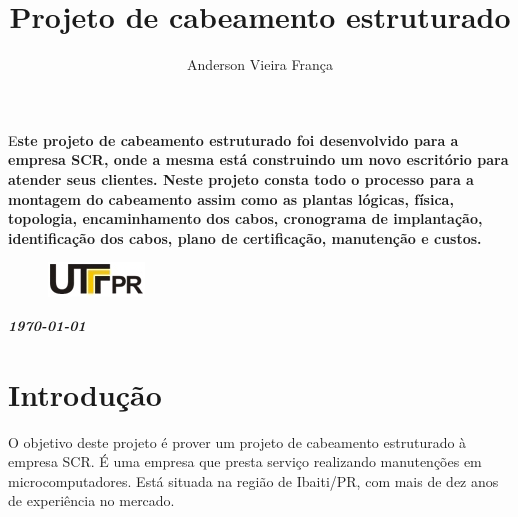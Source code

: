 \documentclass[	DIV=calc,%
							paper=a4,%
							fontsize=12pt,%
							onecolumn]{scrartcl}	 					%
\title{Projeto de cabeamento estruturado}					%
\author{Anderson Vieira França}  	%
\date{}																				%
\newcommand{\initial}[1]{%
     \lettrine[lines=3,lhang=0.3,nindent=0em]{
     				\color{DarkGoldenrod}
     				{\textsf{#1}}}{}}
\begin{document}
\maketitle
\thispagestyle{fancy} 	
\thispagestyle{empty}		%




\initial{E}\textbf{ste projeto de cabeamento estruturado foi desenvolvido para a empresa SCR, onde a mesma está construindo um novo escritório para atender seus clientes. Neste projeto consta todo o processo para a montagem do cabeamento assim como as plantas lógicas, física, topologia, encaminhamento dos cabos, cronograma de implantação, identificação dos cabos, plano de certificação, manutenção e custos.}

\begin{figure}
	\centering
	\includegraphics{utfpr}
\end{figure}

\vspace{3cm}
\centerline{\textit{\textbf{\today}}}

\clearpage
    \renewcommand*\listfigurename{Lista de figuras}
\listoffigures

\renewcommand*\listtablename{Lista de tabelas}
\listoftables




\clearpage
\renewcommand{\contentsname}{Sumário}
\tableofcontents
\clearpage

\section{Introdução}

O objetivo deste projeto é prover um projeto de cabeamento estruturado à empresa SCR. É  uma empresa que presta serviço realizando manutenções em microcomputadores. Está situada na região de Ibaiti/PR, com mais de dez anos de experiência no mercado. 
\end{document}
